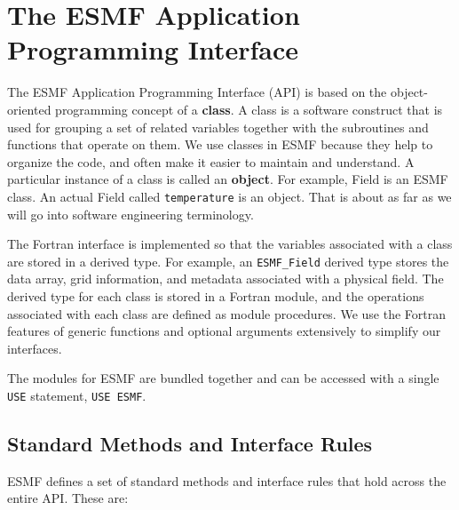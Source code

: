 %

\section{The ESMF Application Programming Interface}

The ESMF Application Programming Interface (API) is based on the
object-oriented programming concept of a {\bf class}.  A class is a 
software construct that is used for grouping a set of related variables 
together with the subroutines and functions that operate on them.  We 
use classes in ESMF because they help to organize the code, and often 
make it easier to maintain and understand.  A particular instance
of a class is called an {\bf object}.  For example, Field is an 
ESMF class.  An actual Field called {\tt temperature} is an object. 
That is about as far as we will go into software engineering
terminology.  

The Fortran interface is implemented so that the variables associated
with a class are stored in a derived type.  For example, an 
{\tt ESMF\_Field} derived type stores the data array, grid 
information, and metadata associated with a physical field.
The derived type for each class is stored in a Fortran module, and 
the operations associated with each class are defined as module
procedures.  We use the Fortran features of generic functions and
optional arguments extensively to simplify our interfaces.

The modules for ESMF are bundled together and can be accessed with a 
single {\tt USE} statement, {\tt USE ESMF}.

\subsection{Standard Methods and Interface Rules}

ESMF defines a set of standard methods and interface rules that
hold across the entire API.  These are: 

